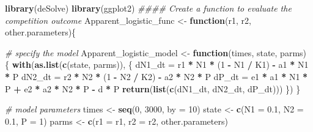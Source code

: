 \documentclass[
]{book}
\newenvironment{Shaded}{\begin{snugshade}}{\end{snugshade}}
\newcommand{\CommentTok}[1]{\textcolor[rgb]{0.56,0.35,0.01}{\textit{#1}}}
\newcommand{\ControlFlowTok}[1]{\textcolor[rgb]{0.13,0.29,0.53}{\textbf{#1}}}
\newcommand{\DataTypeTok}[1]{\textcolor[rgb]{0.13,0.29,0.53}{#1}}
\newcommand{\DecValTok}[1]{\textcolor[rgb]{0.00,0.00,0.81}{#1}}
\newcommand{\FloatTok}[1]{\textcolor[rgb]{0.00,0.00,0.81}{#1}}
\newcommand{\KeywordTok}[1]{\textcolor[rgb]{0.13,0.29,0.53}{\textbf{#1}}}
\newcommand{\NormalTok}[1]{#1}
\newcommand{\OperatorTok}[1]{\textcolor[rgb]{0.81,0.36,0.00}{\textbf{#1}}}
\newcommand{\StringTok}[1]{\textcolor[rgb]{0.31,0.60,0.02}{#1}}
\begin{document}
\begin{Shaded}
\begin{Highlighting}[]
\KeywordTok{library}\NormalTok{(deSolve)}
\KeywordTok{library}\NormalTok{(ggplot2)}
\CommentTok{#### Create a function to evaluate the competition outcome}
\NormalTok{Apparent_logistic_func <-}\StringTok{ }\ControlFlowTok{function}\NormalTok{(r1, r2, other.parameters)\{}

  \CommentTok{# specify the model}
\NormalTok{  Apparent_logistic_model <-}\StringTok{ }\ControlFlowTok{function}\NormalTok{(times, state, parms) \{}
    \KeywordTok{with}\NormalTok{(}\KeywordTok{as.list}\NormalTok{(}\KeywordTok{c}\NormalTok{(state, parms)), \{}
\NormalTok{      dN1_dt =}\StringTok{ }\NormalTok{r1 }\OperatorTok{*}\StringTok{ }\NormalTok{N1 }\OperatorTok{*}\StringTok{ }\NormalTok{(}\DecValTok{1} \OperatorTok{-}\StringTok{ }\NormalTok{N1 }\OperatorTok{/}\StringTok{ }\NormalTok{K1) }\OperatorTok{-}\StringTok{ }\NormalTok{a1 }\OperatorTok{*}\StringTok{ }\NormalTok{N1 }\OperatorTok{*}\StringTok{ }\NormalTok{P}
\NormalTok{      dN2_dt =}\StringTok{ }\NormalTok{r2 }\OperatorTok{*}\StringTok{ }\NormalTok{N2 }\OperatorTok{*}\StringTok{ }\NormalTok{(}\DecValTok{1} \OperatorTok{-}\StringTok{ }\NormalTok{N2 }\OperatorTok{/}\StringTok{ }\NormalTok{K2) }\OperatorTok{-}\StringTok{ }\NormalTok{a2 }\OperatorTok{*}\StringTok{ }\NormalTok{N2 }\OperatorTok{*}\StringTok{ }\NormalTok{P}
\NormalTok{      dP_dt =}\StringTok{ }\NormalTok{e1 }\OperatorTok{*}\StringTok{ }\NormalTok{a1 }\OperatorTok{*}\StringTok{ }\NormalTok{N1 }\OperatorTok{*}\StringTok{ }\NormalTok{P }\OperatorTok{+}\StringTok{ }\NormalTok{e2 }\OperatorTok{*}\StringTok{ }\NormalTok{a2 }\OperatorTok{*}\StringTok{ }\NormalTok{N2 }\OperatorTok{*}\StringTok{ }\NormalTok{P }\OperatorTok{-}\StringTok{ }\NormalTok{d }\OperatorTok{*}\StringTok{ }\NormalTok{P}
      \KeywordTok{return}\NormalTok{(}\KeywordTok{list}\NormalTok{(}\KeywordTok{c}\NormalTok{(dN1_dt, dN2_dt, dP_dt)))}
\NormalTok{    \})}
\NormalTok{  \}}

  \CommentTok{# model parameters}
\NormalTok{  times <-}\StringTok{ }\KeywordTok{seq}\NormalTok{(}\DecValTok{0}\NormalTok{, }\DecValTok{3000}\NormalTok{, }\DataTypeTok{by =} \DecValTok{10}\NormalTok{)}
\NormalTok{  state <-}\StringTok{ }\KeywordTok{c}\NormalTok{(}\DataTypeTok{N1 =} \FloatTok{0.1}\NormalTok{, }\DataTypeTok{N2 =} \FloatTok{0.1}\NormalTok{, }\DataTypeTok{P =} \DecValTok{1}\NormalTok{)}
\NormalTok{  parms <-}\StringTok{ }\KeywordTok{c}\NormalTok{(}\DataTypeTok{r1 =}\NormalTok{ r1, }\DataTypeTok{r2 =}\NormalTok{ r2, other.parameters)}


\end{Highlighting}
\end{Shaded}
\end{document}
